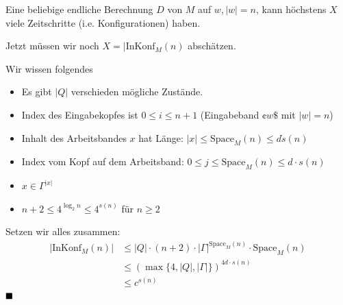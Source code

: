 \documentclass[a4paper, 11pt]{article}
\begin{document}
                            Eine beliebige endliche Berechnung $D$ von $M$ auf $w, |w| = n$, kann höchstens $X$ viele Zeitschritte (i.e. Konfigurationen) haben.
                        
                            Jetzt müssen wir noch $X = |\text{InKonf}_M(n)$ abschätzen.
                            
                            Wir wissen folgendes
                            \begin{itemize}[label=$\blacktriangleright$]
                                
                                \item Es gibt $|Q|$ verschieden mögliche Zustände.
                                
                                \item Index des Eingabekopfes ist $0 \leq i \leq n+1$ (Eingabeband $\cent w \$$ mit $|w| = n$)
                                
                                \item Inhalt des Arbeitsbandes $x$ hat Länge: $|x| \leq \text{Space}_M(n) \leq d \dot s(n)$
                                
                                \item Index vom Kopf auf dem Arbeitsband: $0 \leq j \leq \text{Space}_M(n) \leq d \cdot s(n)$
                                
                                \item $x \in \Gamma^{|x|}$
                                
                                \item $n + 2 \leq 4^{\log_2n}\leq 4^{s(n)}$ für $n \geq 2$
                            \end{itemize}
                        
                    
                            Setzen wir alles zusammen:
                            \begin{align*}
                                |\text{InKonf}_M(n)| &\leq |Q| \cdot (n + 2) \cdot |\Gamma|^{\text{Space}_M(n)}\cdot \text{Space}_M(n)\\
                                                    &\leq (\max\{4, |Q|, |\Gamma|\})^{4d \cdot s(n)}\\
                                                    &\leq c^{s(n)}
                            \end{align*}
                            $\hfill\blacksquare$
            
\end{document}
